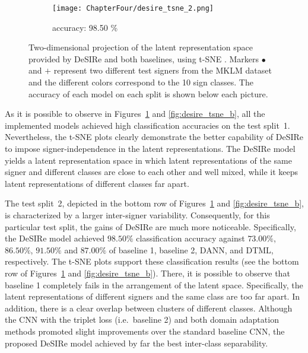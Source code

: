 \begin{figure}[ht!]
\begin{minipage}[t!]{0.985\textwidth}
\begin{subfigure}{0.325\textwidth}
            \centering
            \texttt{[image: ChapterFour/desire\_tsne\_2.png]}
            \caption{accuracy: 98.50 \%}
        \end{subfigure}
    \end{minipage}
    \caption{Two-dimensional projection of the latent representation space provided by DeSIRe and both baselines, using t-SNE \cite{Maaten2008}. Markers $\bullet$ and $\textbf{+}$ represent two different test signers from the MKLM dataset and the different colors correspond to the 10 sign classes. The accuracy of each model on each split is shown below each picture.}
    \label{fig:desire_tsne_a}
\end{figure}

As it is possible to observe in Figures~\ref{fig:desire_tsne_a} and \ref{fig:desire_tsne_b}, all the implemented models achieved high classification accuracies on the test split~1. Nevertheless, the t-SNE plots clearly demonstrate the better capability of DeSIRe to impose signer-independence in the latent representations. The DeSIRe model yields a latent representation space in which latent representations of the same signer and different classes are close to each other and well mixed, while it keeps latent representations of different classes far apart.

The test split~2, depicted in the bottom row of Figures~\ref{fig:desire_tsne_a} and \ref{fig:desire_tsne_b}, is characterized by a larger inter-signer variability. Consequently, for this particular test split, the gains of DeSIRe are much more noticeable. Specifically, the DeSIRe model achieved $98.50\%$ classification accuracy against $73.00\%$, $86.50\%$, $91.50\%$ and $87.00\%$ of baseline 1, baseline 2, DANN, and DTML, respectively. The t-SNE plots support these classification results (see the bottom row of Figures~\ref{fig:desire_tsne_a} and \ref{fig:desire_tsne_b}). There, it is possible to observe that baseline 1 completely fails in the arrangement of the latent space. Specifically, the latent representations of different signers and the same class are too far apart. In addition, there is a clear overlap between clusters of different classes. Although the CNN with the triplet loss (i.e.\ baseline 2) and both domain adaptation methods promoted slight improvements over the standard baseline CNN, the proposed DeSIRe model achieved by far the best inter-class separability.

